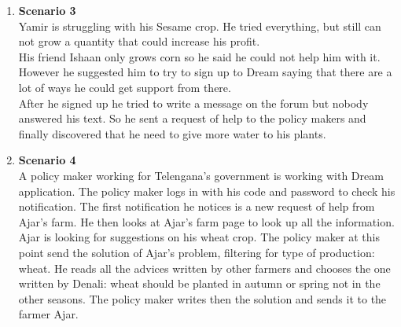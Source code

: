 \begin{enumerate}
    
    \item \textbf{Scenario 3}\\
    Yamir is struggling with his Sesame crop. He tried everything, but still can not grow a quantity 
    that could increase his profit. \\
    His friend Ishaan only grows corn so he said he could not help him with it. However he suggested him to try to sign up to Dream 
    saying that there are a lot of ways he could get support from there. \\
    After he signed up he tried to write a message on the forum but nobody answered his text. 
    So he sent a request of help to the policy makers and finally discovered that he need to give more water to his plants.

    \item \textbf{Scenario 4}\\
    A policy maker working for Telengana's government is working with Dream application. The policy maker logs in with his code and password 
    to check his notification. The first notification he notices is a new request of help from Ajar's farm. He then looks at Ajar's farm page to look up all the information.
    Ajar is looking for suggestions on his wheat crop. The policy maker at this point send the solution of Ajar's problem, 
    filtering for type of production: wheat. 
    He reads all the advices written by other farmers and chooses the one written by Denali: wheat should be 
    planted in autumn or spring not in the other seasons. The policy maker writes then the solution and sends it to the farmer Ajar.

    
    
\end{enumerate}


